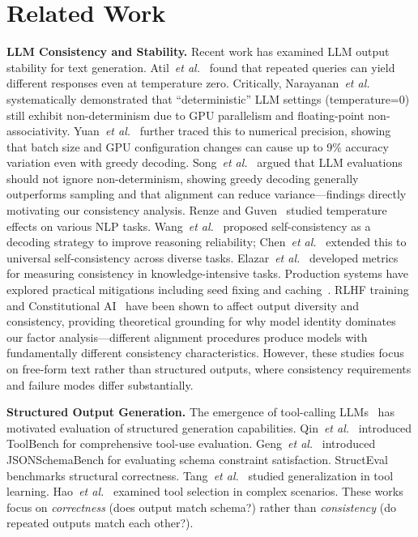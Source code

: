 \documentclass[sigconf,anonymous,review]{acmart}
\newcommand{\etal}{\textit{et al.}}
\begin{document}
\section{Related Work}
\label{sec:related}

\textbf{LLM Consistency and Stability.} Recent work has examined LLM output stability for text generation. Atil~\etal~\cite{atil2024llmconsistency} found that repeated queries can yield different responses even at temperature zero. Critically, Narayanan~\etal~\cite{narayanan2024nondeterminism} systematically demonstrated that ``deterministic'' LLM settings (temperature=0) still exhibit non-determinism due to GPU parallelism and floating-point non-associativity. Yuan~\etal~\cite{yuan2025nondeterminism} further traced this to numerical precision, showing that batch size and GPU configuration changes can cause up to 9\% accuracy variation even with greedy decoding. Song~\etal~\cite{song2024goodbadgreedy} argued that LLM evaluations should not ignore non-determinism, showing greedy decoding generally outperforms sampling and that alignment can reduce variance---findings directly motivating our consistency analysis. Renze and Guven~\cite{renze2024effect} studied temperature effects on various NLP tasks. Wang~\etal~\cite{wang2023selfconsistency} proposed self-consistency as a decoding strategy to improve reasoning reliability; Chen~\etal~\cite{chen2023universal} extended this to universal self-consistency across diverse tasks. Elazar~\etal~\cite{elazar2021measuring} developed metrics for measuring consistency in knowledge-intensive tasks. Production systems have explored practical mitigations including seed fixing and caching~\cite{thinkingmachines2024}. RLHF training~\cite{ouyang2022training} and Constitutional AI~\cite{bai2022constitutional} have been shown to affect output diversity and consistency, providing theoretical grounding for why model identity dominates our factor analysis---different alignment procedures produce models with fundamentally different consistency characteristics. However, these studies focus on free-form text rather than structured outputs, where consistency requirements and failure modes differ substantially.

\textbf{Structured Output Generation.} The emergence of tool-calling LLMs~\cite{patil2023gorilla,schick2024toolformer} has motivated evaluation of structured generation capabilities. Qin~\etal~\cite{qin2023toolllm} introduced ToolBench for comprehensive tool-use evaluation. Geng~\etal~\cite{geng2025jsonschema} introduced JSONSchemaBench for evaluating schema constraint satisfaction. StructEval~\cite{structeval2024} benchmarks structural correctness. Tang~\etal~\cite{tang2023toolalpaca} studied generalization in tool learning. Hao~\etal~\cite{hao2024toolkengpt} examined tool selection in complex scenarios. These works focus on \textit{correctness} (does output match schema?) rather than \textit{consistency} (do repeated outputs match each other?).
\end{document}
